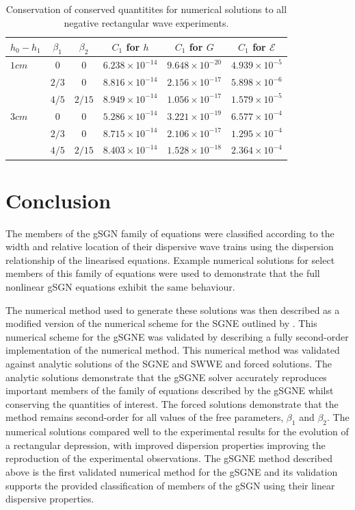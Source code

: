 \documentclass[10pt]{elsarticle}
\newcommand{\hl}[1]{{\color[rgb]{1,0,0}#1}}
\newcommand\T{\rule{0pt}{3ex }}       %
\newcommand\B{\rule[-4ex]{0pt}{4ex }} %
\begin{document}
{\begin{table}
	\centering
	\hl{
	\begin{tabular}{l c c c c c}
		$h_0 - h_1$& $\beta_1$ & $\beta_2$ &$C_1$ for $h$ & $C_1$ for $G$ & $C_1$ for $\mathcal{E}$ \B \\
		\hline 
		$1cm$ &$0$ & $0$ & $6.238\times 10^{-14}$&    $9.648\times 10^{-20}$ & $4.939\times 10^{-5}$ \T\\
		&$2/3$ & $0$ &   $8.816\times 10^{-14}$  &  $2.156\times 10^{-17}$  &  $5.898\times 10^{-6}$
		\T\\	
		&$4/5$ & $2/15$ &   $8.949\times 10^{-14}$   &  $1.056\times 10^{-17}$  &  $1.579\times 10^{-5}$ \T \B\\
		\hline 
		$3cm$ &$0$ & $0$ & $5.286\times 10^{-14}$  &  $3.221\times 10^{-19}$  &  $6.577\times 10^{-4}$ \T\\
		&$2/3$ & $0$ & $8.715\times 10^{-14}$   &  $2.106\times 10^{-17}$  &  $1.295\times 10^{-4}$ \T\\
		&$4/5$ & $2/15$ & $8.403\times 10^{-14}$ &  $1.528\times 10^{-18}$  &  $2.364\times 10^{-4}$  \T\\
	\end{tabular}
}
	\caption{\hl{Conservation of conserved quantitites for numerical solutions to all negative rectangular wave experiments.}}
	\label{tab:Neg_Wave_Cons}
\end{table} 
}

\section{Conclusion}
The members of the gSGN family of equations were classified according to the width and relative location of their dispersive wave trains using the dispersion relationship of the linearised equations. Example numerical solutions for select members of this family of equations were used to demonstrate that the full nonlinear gSGN equations exhibit the same behaviour. 

The numerical method used to generate these solutions was then described as a modified version of the numerical scheme for the SGNE outlined by \citet{Zoppou-etal-2017}. This numerical scheme for the gSGNE was validated by describing a fully second-order implementation of the numerical method. This numerical method was validated against analytic solutions of the SGNE and SWWE and forced solutions. The analytic solutions demonstrate that the gSGNE solver accurately reproduces important members of the family of equations described by the gSGNE whilst conserving the quantities of interest. The forced solutions demonstrate that the method remains second-order for all values of the free parameters, $\beta_1$ and $\beta_2$. \hl{The numerical solutions compared well to the experimental results for the evolution of a rectangular depression, with improved dispersion properties improving the reproduction of the experimental observations.} The gSGNE method described above is the first validated numerical method for the gSGNE and its validation supports the provided classification of members of the gSGN using their linear dispersive properties.


 

\end{document}
